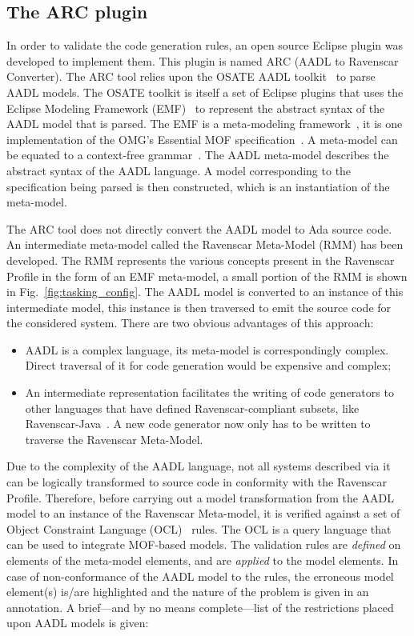 \subsection{The ARC plugin}
\label{sec:arc}
In order to validate the code generation rules, an open source Eclipse
plugin was developed to implement them. This plugin is named ARC (AADL
to Ravenscar Converter). The ARC tool relies upon the OSATE AADL
toolkit~\cite{sei-osate} to parse AADL models. The OSATE toolkit is
itself a set of Eclipse plugins that uses the Eclipse Modeling
Framework (EMF)~\cite{budinsky-emf} to represent the abstract syntax
of the AADL model that is parsed. The EMF is a meta-modeling
framework~\cite{favre-mde}, it is one implementation of the OMG's
Essential MOF specification~\cite{mof-std}. A meta-model can be
equated to a context-free grammar~\cite{alanen-mof-bnf}. The AADL
meta-model describes the abstract syntax of the AADL language. A model
corresponding to the specification being parsed is then constructed,
which is an instantiation of the meta-model.

The ARC tool does not directly convert the AADL model to Ada source
code. An intermediate meta-model called the Ravenscar Meta-Model (RMM)
has been developed. The RMM represents the various concepts present in
the Ravenscar Profile in the form of an EMF meta-model, a small
portion of the RMM is shown in Fig.~\ref{fig:tasking_config}. The AADL
model is converted to an instance of this intermediate model, this
instance is then traversed to emit the source code for the considered
system. There are two obvious advantages of this approach:

\begin{itemize}
\item{AADL is a complex language, its meta-model is correspondingly
  complex. Direct traversal of it for code generation would be
  expensive and complex;}
\item{An intermediate representation facilitates the writing of code
  generators to other languages that have defined Ravenscar-compliant
  subsets, like Ravenscar-Java~\cite{kwon@jgi02,
    sondergaard@jtres06}. A new code generator now only has to be
  written to traverse the Ravenscar Meta-Model.}
\end{itemize}

Due to the complexity of the AADL language, not all systems described
via it can be logically transformed to source code in conformity with
the Ravenscar Profile. Therefore, before carrying out a model
transformation from the AADL model to an instance of the Ravenscar
Meta-model, it is verified against a set of Object Constraint Language
(OCL)~\cite{ocl} rules. The OCL is a query language that can be used
to integrate MOF-based models. The validation rules are \emph{defined}
on elements of the meta-model elements, and are \emph{applied} to the
model elements. In case of non-conformance of the AADL model to the
rules, the erroneous model element(s) is/are highlighted and the
nature of the problem is given in an annotation. A brief---and by no
means complete---list of the restrictions placed upon AADL models is
given:

